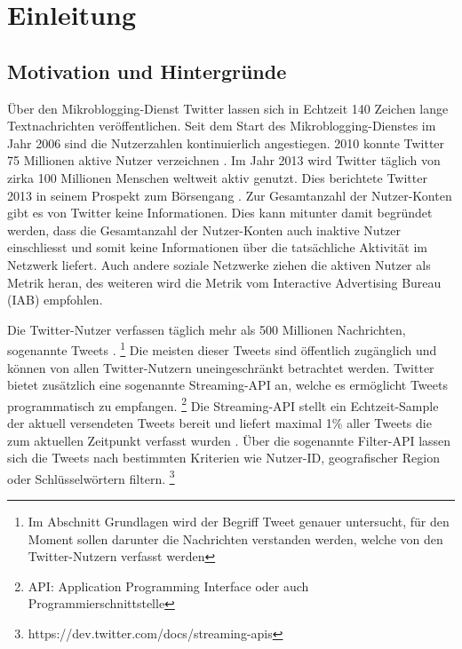 \chapter{Einleitung}\label{chp:Einleitung}

	\section{Motivation und Hintergründe}

		Über den Mikroblogging-Dienst Twitter lassen sich in Echtzeit 140 Zeichen lange Textnachrichten veröffentlichen.
		Seit dem Start des Mikroblogging-Dienstes im Jahr 2006 sind die Nutzerzahlen kontinuierlich angestiegen.
		2010 konnte Twitter 75 Millionen aktive Nutzer verzeichnen \cite{Cheng2010}.
		Im Jahr 2013 wird Twitter täglich von zirka 100 Millionen Menschen weltweit aktiv genutzt.
		Dies berichtete Twitter 2013 in seinem Prospekt zum Börsengang \cite{twitterinc2013}.  
		Zur Gesamtanzahl der Nutzer-Konten gibt es von Twitter keine Informationen. 
		Dies kann mitunter damit begründet werden, dass die Gesamtanzahl der Nutzer-Konten auch inaktive Nutzer einschliesst und somit keine Informationen über die tatsächliche Aktivität im Netzwerk liefert. 
		Auch andere soziale Netzwerke ziehen die aktiven Nutzer als Metrik heran, des weiteren wird die Metrik vom Interactive Advertising Bureau (IAB) empfohlen. \cite{IAB}
		
		Die Twitter-Nutzer verfassen täglich mehr als 500 Millionen Nachrichten, sogenannte Tweets \cite{twitterinc2013}. \footnote{Im Abschnitt Grundlagen wird der Begriff Tweet genauer untersucht, für den Moment sollen darunter die Nachrichten verstanden werden, welche von den Twitter-Nutzern verfasst werden}
		Die meisten dieser Tweets sind öffentlich zugänglich und können von allen Twitter-Nutzern uneingeschränkt betrachtet werden. 
		Twitter bietet zusätzlich eine sogenannte Streaming-API an, welche es ermöglicht Tweets programmatisch zu empfangen. \footnote{API: Application Programming Interface oder auch Programmierschnittstelle}
		Die Streaming-API stellt ein Echtzeit-Sample der aktuell versendeten Tweets bereit und liefert maximal 1\% aller Tweets die zum aktuellen Zeitpunkt verfasst wurden \cite{Morstatter2013}. 
		Über die sogenannte Filter-API lassen sich die Tweets nach bestimmten Kriterien wie Nutzer-ID, geografischer Region oder Schlüsselwörtern filtern.
		 \footnote{https://dev.twitter.com/docs/streaming-apis} 

